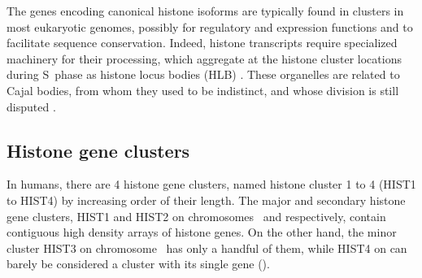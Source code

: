 \documentclass[10pt,a4paper,onecolumn,article]{memoir}
\begin{document}
    The genes encoding canonical histone isoforms are typically found in clusters in most
    eukaryotic genomes, possibly for regulatory and expression functions and to facilitate
    sequence conservation. Indeed, histone transcripts require specialized machinery for
    their processing, which aggregate at the histone cluster locations during S~phase as
    histone locus bodies (HLB) \citep{human-first-HLB-report, human-HLB-report-GhuleEtAl2008}.
    These organelles are related to Cajal bodies, from whom they used to be indistinct, and
    whose division is still disputed \citep{CB-HLB-review}.

    \subsection{Histone gene clusters}
      In humans, there are 4 histone gene clusters, named histone cluster 1 to 4 (HIST1 to HIST4)
      by increasing order of their length. The major and secondary histone gene clusters,
      HIST1 and HIST2 on chromosomes~\HISTOneLocus{} and \HISTTwoLocus{} respectively,
      contain contiguous high density arrays of histone genes. On the other hand, the minor
      cluster HIST3 on chromosome~\HISTThreeLocus{} has only a handful of them, while HIST4
      on \HISTFourLocus{} can barely be considered a cluster with its single gene
      ().
\end{document}
